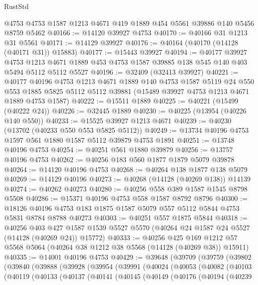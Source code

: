 \begin{lexlean}{RustStd}
\begin{coremodule}
    @4753
    @4753
    @1587
    @1213
    @4671
    @419
    @1889
    @454
    @5561
    @39886
    @140
    @5456
    @8759
    @5462
@40166 := @14120 @39927 @4753
@40170 := @40166 @31 @1213 @31 @5561
@40171 := @14129 @39927
@40176 := @40164 (@40170 (@14128 (@40171 @31)) @15883)
@40177 := @15443 @39927
@40194 := @40177
    @39927
    @4753
    @1213
    @4671
    @1889
    @453
    @4753
    @1587
    @39885
    @138
    @545
    @140
    @403
    @5494
    @5112
    @5112
    @5527
@40196 := @32409 (@32413 @39927)
@40221 := @40177
    @40196
    @4753
    @1213
    @4671
    @1889
    @140
    @4753
    @1587
    @5119
    @24
    @550
    @553
    @1885
    @5825
    @5112
    @5112
    @39881
    (@15489 @39927 @4753 @1213 @4671 @1889 @4753 @1587)
@40222 := @15511 @1889
@40225 := @40221 (@15499 (@40222 @24))
@40226 := @32445 @1889
@40230 := @40225 (@13954 (@40226 @140 @550))
@40233 := @15525 @39927 @1213 @4671
@40239 := @40230 (@13702 (@40233 @550 @553 @5825 @5112))
@40249 := @13734 @40196 @4753 @1597 @561 @1880 @1587 @5112 @39879 @4753 @1891
@40251 := @13748 @40196 @4753
@40254 := @40251 @561 @1880 @39879
@40256 := @13757 @40196 @4753
@40262 := @40256 @183 @560 @1877 @1879 @5079 @39878
@40264 := @14120 @40196 @4753
@40268 := @40264 @138 @1877 @138 @5079
@40269 := @14129 @40196
@40273 := @40268 (@14128 (@40269 @138)) @14139
@40274 := @40262 @40273
@40280 := @40256 @558 @389 @1587 @1545 @8798 @5508
@40286 := @15371 @40196 @4753 @558 @1587 @8792 @8796
@40300 := @18126 @40196 @4753 @183 @1875 @1587 @5079 @557 @5112 @5844 @4753 @5831 @8784 @8788 @40273
@40303 := @40251 @557 @1875 @5844
@40318 := @40256
    @403
    @427
    @1587
    @1539
    @5527
    @5570
    (@40264 @24 @1587 @24 @5527 (@14128 (@40269 @24)) @15772)
@40333 := @40256
    @425
    @169
    @1212
    @57
    @5568
    @5064
    (@40264 @38 @1212 @38 @5568 (@14128 (@40269 @38)) @15911)
@40335 := @14001 @40196 @4753
@40429 := @39648
    (@39709
      (@39759
        (@39802
          (@39840
            (@39888
              (@39928
                (@39954
                  (@39991
                    (@40024
                      (@40053
                        (@40082
                          (@40103
                            (@40119
                              (@40133
                                (@40137
                                  (@40141
                                    (@40145
                                      (@40149
                                        (@40176
                                          (@40194
                                            (@40239

\end{coremodule}
\end{lexlean}
